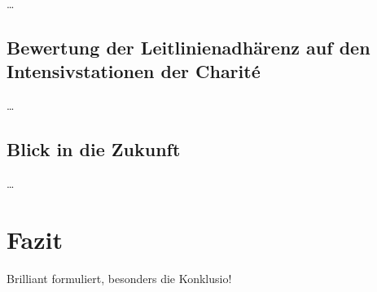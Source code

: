 \dots

\section{Bewertung der Leitlinienadhärenz auf den Intensivstationen der Charité}
\dots

\section{Blick in die Zukunft}
\dots

\chapter{Fazit}
Brilliant formuliert, besonders die Konklusio!


